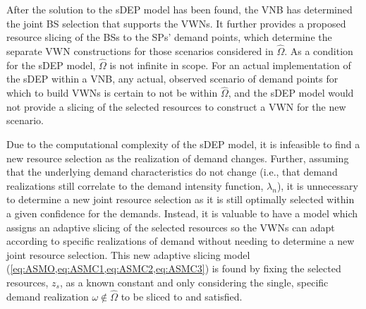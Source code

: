 \documentclass[12pt,dvipsnames]{report}
\begin{document}
After the solution to the sDEP model has been found, the VNB has determined the joint BS selection that supports the VWNs.  It further provides a proposed resource slicing of the BSs to the SPs' demand points, which determine the separate VWN constructions for those scenarios considered in $\hat{\Omega}$.  As a condition for the sDEP model, $\hat{\Omega}$ is not infinite in scope.  For an actual implementation of the sDEP within a VNB, any actual, observed scenario of demand points for which to build VWNs is certain to not be within $\hat{\Omega}$, and the sDEP model would not provide a slicing of the selected resources to construct a VWN for the new scenario.

Due to the computational complexity of the sDEP model, it is infeasible to find a new resource selection as the realization of demand changes.  Further, assuming that the underlying demand characteristics do not change (i.e., that demand realizations still correlate to the demand intensity function, $\lambda_n$), it is unnecessary to determine a new joint resource selection as it is still optimally selected within a given confidence for the demands.  Instead, it is valuable to have a model which assigns an adaptive slicing of the selected resources so the VWNs can adapt according to specific realizations of demand without needing to determine a new joint resource selection.  This new adaptive slicing model (\cref{eq:ASMO,eq:ASMC1,eq:ASMC2,eq:ASMC3}) is found by fixing the selected resources, $z_s$, as a known constant and only considering the single, specific demand realization $\omega \notin \hat{\Omega}$ to be sliced to and satisfied.

\end{document}
